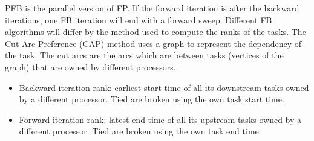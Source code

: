 \documentclass[letterpaper]{article}
\renewcommand{\(}{\left(}
\renewcommand{\)}{\right)}
\renewcommand{\[}{\left[}
\renewcommand{\]}{\right]}
\begin{document}
PFB is the parallel version of FP. If the forward iteration is after the
backward iterations, one
FB iteration will end with a forward sweep. Different FB
algorithms will differ by the method used to compute the ranks of the tasks. The
Cut Arc Preference (CAP) method uses a graph to represent the dependency of the
task. The cut arcs are the arcs which are between tasks (vertices of the
graph) that are owned by different processors.
\begin{itemize}
  \item Backward iteration rank: earliest start time of all its downstream tasks
    owned by a different processor. Tied are broken using the own task start time.
  \item Forward iteration rank: latest end time of all its upstream tasks owned
    by a different processor. Tied are broken using the own task end time.
\end{itemize}
\end{document}
